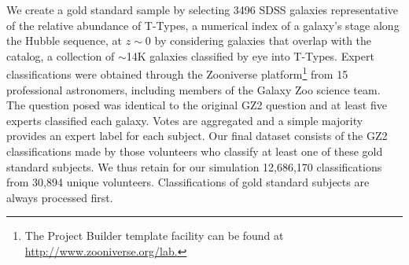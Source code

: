 \documentclass[twocolumn]{aastex6}
\begin{document}
We create a gold standard sample by selecting 3496 SDSS galaxies 
representative of the relative abundance of T-Types, a numerical index of a galaxy's stage along 
the Hubble sequence, at $z\sim0$ by considering galaxies that overlap 
with the~\cite{NairAbraham2010} catalog, a collection of $\sim$14K galaxies 
classified by eye into T-Types. 
Expert classifications were obtained through the Zooniverse platform\footnote{The Project Builder template facility can be found at \url{http://www.zooniverse.org/lab.}}  
from 15 professional astronomers, including members of the Galaxy Zoo science team. 
 The question posed was identical to the original GZ2 question and at least five 
experts classified each galaxy. 
Votes are aggregated and a simple majority provides an expert label for each subject. 
Our final dataset consists of the GZ2 classifications made 
by those volunteers who classify at least one of these gold standard subjects. 
We thus retain for our simulation 12,686,170 classifications from 30,894 unique volunteers. 
Classifications of gold standard subjects are always processed first. 
\end{document}
